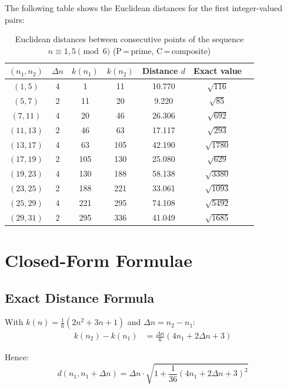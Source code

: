 \begin{example}
The following table shows the Euclidean distances for the first
integer-valued pairs:

\begin{table}[H]
	\centering
	\caption{Euclidean distances between consecutive points of
		the sequence $n \equiv 1,5 \pmod{6}$ (P\,=\,prime, C\,=\,composite)}
	\begin{tabular}{ccccccc}
		\toprule
		$(n_1, n_2)$ & $\Delta n$ & $k(n_1)$ & $k(n_2)$ & Distance $d$ & Exact value \\
		\midrule
		$( 1,  5)$ & 4 &   1 &  11 &  10.770 & $\sqrt{116}$  \\
		$( 5,  7)$ & 2 &  11 &  20 &   9.220 & $\sqrt{85}$   \\
		$( 7, 11)$ & 4 &  20 &  46 &  26.306 & $\sqrt{692}$  \\
		$(11, 13)$ & 2 &  46 &  63 &  17.117 & $\sqrt{293}$  \\
		$(13, 17)$ & 4 &  63 & 105 &  42.190 & $\sqrt{1780}$ \\
		$(17, 19)$ & 2 & 105 & 130 &  25.080 & $\sqrt{629}$  \\
		$(19, 23)$ & 4 & 130 & 188 &  58.138 & $\sqrt{3380}$ \\
		$(23, 25)$ & 2 & 188 & 221 &  33.061 & $\sqrt{1093}$ \\  %
		$(25, 29)$ & 4 & 221 & 295 &  74.108 & $\sqrt{5492}$ \\
		$(29, 31)$ & 2 & 295 & 336 &  41.049 & $\sqrt{1685}$ \\
		\bottomrule
	\end{tabular}
\end{table}
\end{example}

\section{Closed-Form Formulae}

\subsection{Exact Distance Formula}

\begin{proposition}
With $k(n) = \frac{1}{6}(2n^2 + 3n + 1)$ and $\Delta n = n_2 - n_1$:
\begin{align}
k(n_2) - k(n_1) &= \frac{\Delta n}{6}(4n_1 + 2\Delta n + 3)
\end{align}

Hence:
\begin{equation}
d(n_1, n_1 + \Delta n) = \Delta n \cdot \sqrt{1 + \frac{1}{36}(4n_1 + 2\Delta n + 3)^2}
\end{equation}
\end{proposition}

